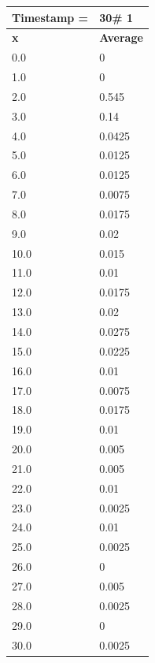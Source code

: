 \begin{tabular}{|l||l|}
\hline
\textbf{Timestamp =} & \textbf{30}\# 1\\\hline
	\textbf{x} & \textbf{Average} \\ \hline
\hline
	0.0 & 0 \\ \hline
	1.0 & 0 \\ \hline
	2.0 & 0.545 \\ \hline
	3.0 & 0.14 \\ \hline
	4.0 & 0.0425 \\ \hline
	5.0 & 0.0125 \\ \hline
	6.0 & 0.0125 \\ \hline
	7.0 & 0.0075 \\ \hline
	8.0 & 0.0175 \\ \hline
	9.0 & 0.02 \\ \hline
	10.0 & 0.015 \\ \hline
	11.0 & 0.01 \\ \hline
	12.0 & 0.0175 \\ \hline
	13.0 & 0.02 \\ \hline
	14.0 & 0.0275 \\ \hline
	15.0 & 0.0225 \\ \hline
	16.0 & 0.01 \\ \hline
	17.0 & 0.0075 \\ \hline
	18.0 & 0.0175 \\ \hline
	19.0 & 0.01 \\ \hline
	20.0 & 0.005 \\ \hline
	21.0 & 0.005 \\ \hline
	22.0 & 0.01 \\ \hline
	23.0 & 0.0025 \\ \hline
	24.0 & 0.01 \\ \hline
	25.0 & 0.0025 \\ \hline
	26.0 & 0 \\ \hline
	27.0 & 0.005 \\ \hline
	28.0 & 0.0025 \\ \hline
	29.0 & 0 \\ \hline
	30.0 & 0.0025 \\ \hline
\end{tabular}
